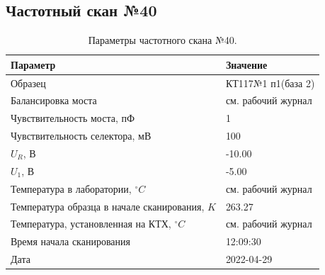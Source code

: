 \subsection{Частотный скан №40}
\begin{table}[!ht]
    \centering
    \caption{Параметры частотного скана №40.}
    \begin{tabular}{|l|l|}
        \hline
        Параметр                                       & Значение                  \\ \hline
        Образец                                        & КТ117№1 п1(база 2)        \\ \hline
        Балансировка моста                             & см. рабочий журнал        \\ \hline
        Чувствительность моста, пФ                     & 1                         \\ \hline
        Чувствительность селектора, мВ                 & 100                       \\ \hline
        $U_R$, В                                       & -10.00                    \\ \hline
        $U_1$, В                                       & -5.00                     \\ \hline
        Температура в лаборатории, $^\circ C$          & см. рабочий журнал        \\ \hline
        Температура образца в начале сканирования, $K$ & 263.27                    \\ \hline
        Температура, установленная на КТХ, $^\circ C$  & см. рабочий журнал        \\ \hline
        Время начала сканирования                      & 12:09:30                  \\ \hline
        Дата                                           & 2022-04-29                \\ \hline
    \end{tabular}
    \label{table:frequency_scan_40}
\end{table}

